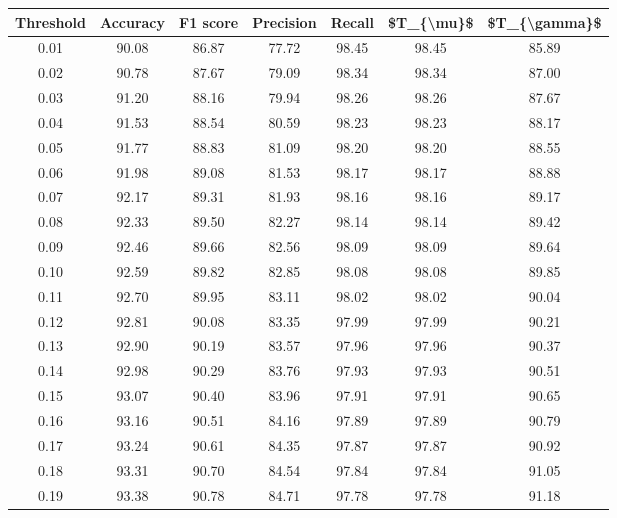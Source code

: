 \begin{tabular}{|c|c|c|c|c|c|c|}
\hline
 Threshold &  Accuracy &  F1 score &  Precision &  Recall &  \$T\_\{\textbackslash mu\}\$ &  \$T\_\{\textbackslash gamma\}\$ \\
\hline
      0.01 &     90.08 &     86.87 &      77.72 &   98.45 &      98.45 &         85.89 \\
      0.02 &     90.78 &     87.67 &      79.09 &   98.34 &      98.34 &         87.00 \\
      0.03 &     91.20 &     88.16 &      79.94 &   98.26 &      98.26 &         87.67 \\
      0.04 &     91.53 &     88.54 &      80.59 &   98.23 &      98.23 &         88.17 \\
      0.05 &     91.77 &     88.83 &      81.09 &   98.20 &      98.20 &         88.55 \\
      0.06 &     91.98 &     89.08 &      81.53 &   98.17 &      98.17 &         88.88 \\
      0.07 &     92.17 &     89.31 &      81.93 &   98.16 &      98.16 &         89.17 \\
      0.08 &     92.33 &     89.50 &      82.27 &   98.14 &      98.14 &         89.42 \\
      0.09 &     92.46 &     89.66 &      82.56 &   98.09 &      98.09 &         89.64 \\
      0.10 &     92.59 &     89.82 &      82.85 &   98.08 &      98.08 &         89.85 \\
      0.11 &     92.70 &     89.95 &      83.11 &   98.02 &      98.02 &         90.04 \\
      0.12 &     92.81 &     90.08 &      83.35 &   97.99 &      97.99 &         90.21 \\
      0.13 &     92.90 &     90.19 &      83.57 &   97.96 &      97.96 &         90.37 \\
      0.14 &     92.98 &     90.29 &      83.76 &   97.93 &      97.93 &         90.51 \\
      0.15 &     93.07 &     90.40 &      83.96 &   97.91 &      97.91 &         90.65 \\
      0.16 &     93.16 &     90.51 &      84.16 &   97.89 &      97.89 &         90.79 \\
      0.17 &     93.24 &     90.61 &      84.35 &   97.87 &      97.87 &         90.92 \\
      0.18 &     93.31 &     90.70 &      84.54 &   97.84 &      97.84 &         91.05 \\
      0.19 &     93.38 &     90.78 &      84.71 &   97.78 &      97.78 &         91.18 \\

\end{tabular}
